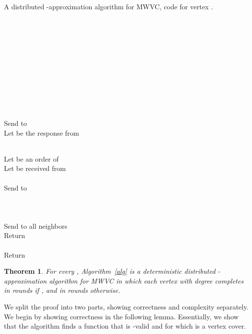 \documentclass[11pt]{article}
\newtheorem{theorem}{Theorem}[section]
\begin{document}
\LinesNumbered
\begin{algorithm}[htbp]
	\label{alg}
	\caption{A distributed -approximation algorithm for MWVC, code for vertex .}
	\\
	\\
	\\
	\\
	\\
	\While{}
	{
		\\
		\\
		\\
		\ForEach{}
		{		
			\\
			Send  to \\
			Let  be the response from \\
			\\
			\If{}
			{
				
			}
		}
		Let  be an order of \\
		\ForEach{}
		{
			Let  be received from \\
			\\
			Send  to 
		}
		\\
		\\
		\\
		\\
		\If{}
		{
            		Send  to all neighbors\\
            		Return \\
        		}
        		{
            		\\
            		
        		}
        		\If{}
        		{
            		Return 
        		}
    	}	
\end{algorithm}

\begin{theorem}
\label{thm:alg}
For every , Algorithm~\ref{alg} is a deterministic distributed -approximation algorithm for MWVC in which each vertex  with degree  completes in  rounds if , and in  rounds otherwise.
\end{theorem}
We split the proof into two parts, showing correctness and complexity separately. We begin by showing correctness in the following lemma. Essentially, we show that the algorithm finds a function  that is -valid and for which  is a vertex cover.
\end{document}
